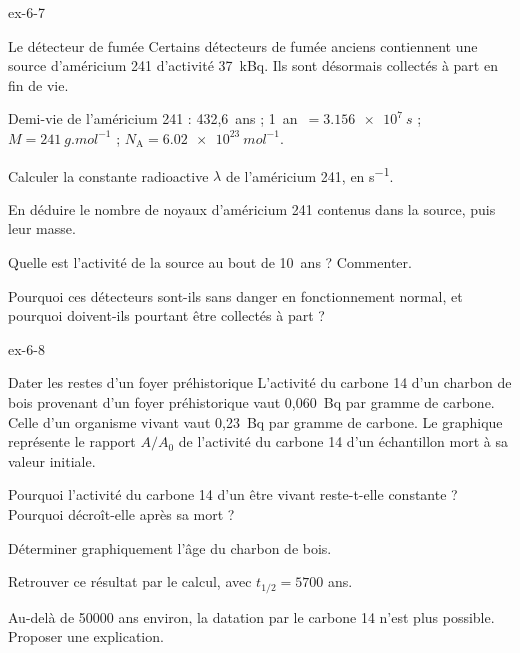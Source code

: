 \begin{blocLivre}{ex-6-7}
\begin{exercice}[2]{Le détecteur de fumée}
Certains détecteurs de fumée anciens contiennent une source d'américium 241 d'activité 37~kBq. Ils sont désormais
collectés à part en fin de vie.
\begin{donnees}
Demi-vie de l'américium 241 : 432,6~ans ; \mbox{1 an $=\qty{3,156e7}{s}$} ; $M=\qty{241}{g.mol^{-1}}$ ;
$N_\mathrm{A}=\qty{6,02e23}{mol^{-1}}$.
\end{donnees}
\begin{questions}
\item Calculer la constante radioactive $\lambda$ de l'américium 241, en \unit{s^{-1}}.
\item En déduire le nombre de noyaux d'américium 241 contenus dans la source, puis leur masse.
\item Quelle est l'activité de la source au bout de 10~ans ? Commenter.
\item Pourquoi ces détecteurs sont-ils sans danger en fonctionnement normal, et pourquoi doivent-ils pourtant être collectés à part ?
\end{questions}
\end{exercice}
\end{blocLivre}
\begin{blocLivre}{ex-6-8}
\begin{exercice}[2]{Dater les restes d'un foyer préhistorique}
L'activité du carbone 14 d'un charbon de bois provenant d'un foyer préhistorique vaut 0,060~Bq par gramme de carbone.
Celle d'un organisme vivant vaut 0,23~Bq par gramme de carbone. Le graphique représente le rapport $A/A_0$ de
l'activité du carbone 14 d'un échantillon mort à sa valeur initiale.
\begin{questions}
\item Pourquoi l'activité du carbone 14 d'un être vivant reste-t-elle constante ? Pourquoi décroît-elle après sa mort ?
\item Déterminer graphiquement l'âge du charbon de bois.
\item Retrouver ce résultat par le calcul, avec $t_{1/2}=\num{5700}$ ans.
\item Au-delà de \num{50000} ans environ, la datation par le carbone 14 n'est plus possible. Proposer une explication.
\end{questions}
\end{exercice}
\end{blocLivre}

